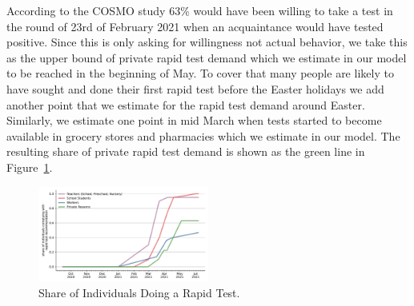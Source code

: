 According to the COSMO study \citep{Betsch2021a} 63\% would have been willing to take a
test in the round of 23rd of February 2021 when an acquaintance would have tested
positive. Since this is only asking for willingness not actual behavior, we take this as
the upper bound of private rapid test demand which we estimate in our model to be reached
in the beginning of May. To cover that many people are likely to have sought and done
their first rapid test before the Easter holidays we add another point that we estimate
for the rapid test demand around Easter. Similarly, we estimate one point in mid March
when tests started to become available in grocery stores and pharmacies which we estimate
in our model. The resulting share of private rapid test demand is shown as the green line
in Figure~\ref{fig:rapid_test_demand}.


\begin{figure}
    \centering
    \includegraphics[width=0.5\textwidth]{figures/results/figures/data/testing/rapid_test_demand/baseline_shares}
    \caption{Share of Individuals Doing a Rapid Test.}
    \label{fig:rapid_test_demand}
    \label{fig:rapid_test_demand}
\end{figure}

\FloatBarrier